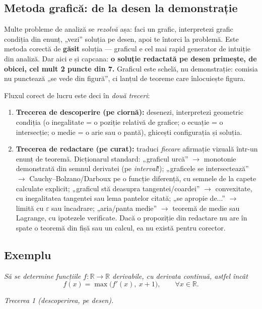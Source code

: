 \subsection{Metoda grafică: de la desen la demonstrație}

Multe probleme de analiză se \emph{rezolvă} așa: faci un grafic, interpretezi grafic condiția din enunț, „vezi'' soluția pe desen, apoi te întorci la problemă. Este metoda corectă de \textbf{găsit} soluția --- graficul e cel mai rapid generator de intuiție din analiză. Dar aici e și capcana: \textbf{o soluție redactată pe desen primește, de obicei, cel mult 2 puncte din 7.} Graficul este schelă, nu demonstrație: comisia nu punctează „se vede din figură'', ci lanțul de teoreme care înlocuiește figura.

Fluxul corect de lucru este deci în \emph{două treceri}:
\begin{enumerate}[leftmargin=*, itemsep=2pt]
\item \textbf{Trecerea de descoperire (pe ciornă):} desenezi, interpretezi geometric condiția (o inegalitate = o poziție relativă de grafice; o ecuație = o intersecție; o medie = o arie sau o pantă), ghicești configurația și soluția.
\item \textbf{Trecerea de redactare (pe curat):} traduci \emph{fiecare} afirmație vizuală într-un enunț de teoremă. Dicționarul standard: „graficul urcă'' $\to$ monotonie demonstrată din semnul derivatei (pe \emph{interval}!); „graficele se intersectează'' $\to$ Cauchy--Bolzano/Darboux pe o funcție diferență, cu semnele de la capete calculate explicit; „graficul stă deasupra tangentei/coardei'' $\to$ convexitate, cu inegalitatea tangentei sau lema pantelor citată; „se apropie de...'' $\to$ limită cu $\varepsilon$ sau încadrare; „aria/panta medie'' $\to$ teoremă de medie sau Lagrange, cu ipotezele verificate. Dacă o propoziție din redactare nu are în spate o teoremă din fișă sau un calcul, ea nu există pentru corector.
\end{enumerate}

\subsection*{Exemplu}

\emph{Să se determine funcțiile $f:\mathbb{R}\to\mathbb{R}$ derivabile, cu derivata continuă, astfel încât}
\[
f(x)=\max\big(f'(x),\ x+1\big),\qquad\forall x\in\mathbb{R}.
\]

\emph{Trecerea 1 (descoperirea, pe desen).}

